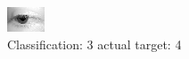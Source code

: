 \begin{figure}[h!]
\begin{center}
\includegraphics[width=0.60\columnwidth]{figures/ID2576_class_3_target_4.png}
\end{center}
\caption{ Classification: 3 actual target: 4}
\label{fig:ID2576_class_3_target_4}
\end{figure}
